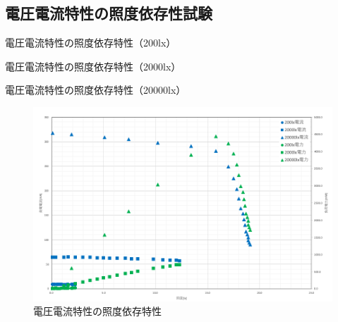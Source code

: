 \subsection{電圧電流特性の照度依存性試験}
\begin{table}[H]
  \small
  \centering
  \caption{電圧電流特性の照度依存特性（200lx）}
  
\end{table}

\begin{table}[H]
  \small
  \centering
  \caption{電圧電流特性の照度依存特性（2000lx）}
  
\end{table}

\begin{table}[H]
  \small
  \centering
  \caption{電圧電流特性の照度依存特性（20000lx）}
  
\end{table}

\begin{figure}[H]
  \centering
  \includegraphics[width=15cm]{./fig/fig05.png}
  \caption{電圧電流特性の照度依存特性}
\end{figure}


